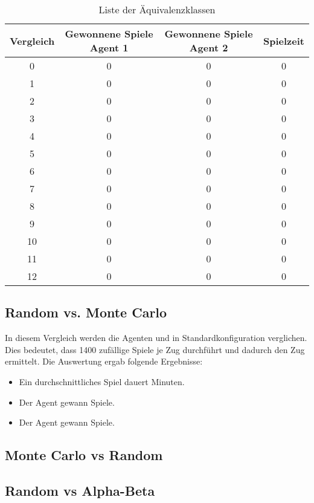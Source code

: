 \begin{table}[ht]
\begin{center}
\begin{tabular}{| c | c | c | c |} \hline
Vergleich & Gewonnene Spiele Agent 1 & Gewonnene Spiele Agent 2 & Spielzeit \\ \hline
\hline
0 & 0 & 0 & 0  \\ \hline
1 & 0 & 0 & 0  \\ \hline
2 & 0 & 0 & 0  \\ \hline
3 & 0 & 0 & 0  \\ \hline
4 & 0 & 0 & 0  \\ \hline
5 & 0 & 0 & 0  \\ \hline
6 & 0 & 0 & 0  \\ \hline
7 & 0 & 0 & 0  \\ \hline
8 & 0 & 0 & 0  \\ \hline
9 & 0 & 0 & 0  \\ \hline
10 & 0 & 0 & 0  \\ \hline
11 & 0 & 0 & 0  \\ \hline
12 & 0 & 0 & 0  \\ \hline
\end{tabular}
\end{center}
\caption{Liste der Äquivalenzklassen}
\label{tbl:cmp-results}
\end{table}

\subsection{Random vs. Monte Carlo}
In diesem Vergleich werden die Agenten  und  in Standardkonfiguration verglichen. Dies bedeutet, dass  1400 zufällige Spiele je Zug durchführt und dadurch den  Zug ermittelt.
Die Auswertung ergab folgende Ergebnisse:
\begin{itemize}
\item Ein durchschnittliches Spiel dauert Minuten.
\item Der Agent  gewann Spiele.
\item Der Agent  gewann Spiele.
\end{itemize}

\subsection{Monte Carlo vs Random}

\subsection{Random vs Alpha-Beta}


